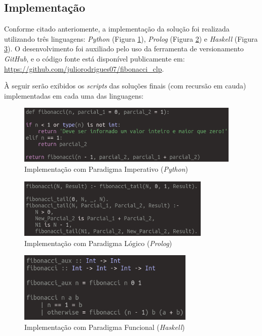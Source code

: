 \documentclass[a4paper, 12pt]{article}
\begin{document}
\subsection{Implementação}

Conforme citado anteriomente, a implementação da solução foi realizada utilizando três linguagens: \emph{Python} (Figura \ref{fig:exampleFig1}), \emph{Prolog} (Figura \ref{fig:exampleFig2}) e \emph{Haskell} (Figura \ref{fig:exampleFig3}). O desenvolvimento foi auxiliado pelo uso da ferramenta de versionamento \emph{GitHub}, e o código fonte está disponível publicamente em: \url{https://github.com/juliorodrigues07/fibonacci_clp}.

À seguir serão exibidos os \emph{scripts} das soluções finais (com recursão em cauda) implementadas em cada uma das linguagens:

\begin{figure}[H]
    \centering
    \includegraphics[width=0.95\textwidth]{Images/python.png}
    \caption{Implementação com Paradigma Imperativo (\emph{Python})}
    \label{fig:exampleFig1}
\end{figure}

\begin{figure}[H]
    \centering
    \includegraphics[width=0.82\textwidth]{Images/prolog.png}
    \caption{Implementação com Paradigma Lógico (\emph{Prolog})}
    \label{fig:exampleFig2}
\end{figure}

\begin{figure}[H]
    \centering
    \includegraphics[width=0.75\textwidth]{Images/haskell.png}
    \caption{Implementação com Paradigma Funcional (\emph{Haskell})}
    \label{fig:exampleFig3}
\end{figure}
\end{document}
